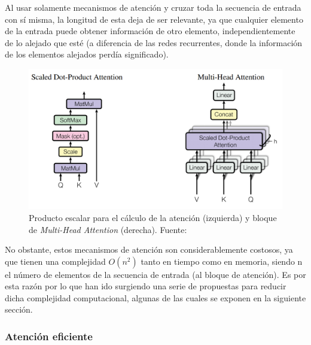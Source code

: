Al usar solamente mecanismos de atención y cruzar toda la secuencia de entrada con sí misma, la longitud de esta deja de ser relevante, ya que cualquier elemento de la entrada puede obtener información de otro elemento, independientemente de lo alejado que esté (a diferencia de las redes recurrentes, donde la información de los elementos alejados perdía significado).


\begin{figure}[H]
\centering
\includegraphics[width=0.65\linewidth]{imagenes/multi-head-attention.png} 
\captionsetup{width=.8\linewidth}
\caption{Producto escalar para el cálculo de la atención (izquierda) y bloque de \textit{Multi-Head Attention} (derecha). Fuente: \cite{NIPS2017_3f5ee243}}
\label{fig:multi-head-attention}
\end{figure}

No obstante, estos mecanismos de atención son considerablemente costosos, ya que tienen una complejidad $O(n^{2})$ tanto en tiempo como en memoria, siendo n el número de elementos de la secuencia de entrada (al bloque de atención). Es por esta razón por lo que han ido surgiendo una serie de propuestas para reducir dicha complejidad computacional, algunas de las cuales se exponen en la siguiente sección.



\subsubsection{Atención eficiente}



